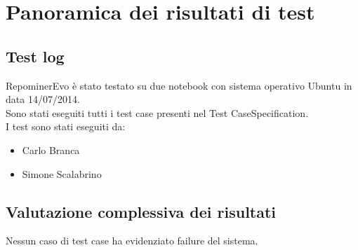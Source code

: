 \chapter{Panoramica dei risultati di test}

\section{Test log}

RepominerEvo è stato testato su due notebook con sistema operativo Ubuntu in data 14/07/2014.\\
Sono stati eseguiti tutti i test case presenti nel Test CaseSpecification.\\
I test sono stati eseguiti da:
\begin{itemize}
\item Carlo Branca
\item Simone Scalabrino
\end{itemize}

\section{Valutazione complessiva dei risultati}

Nessun caso di test case ha evidenziato failure del sistema.\\

\clearpage
